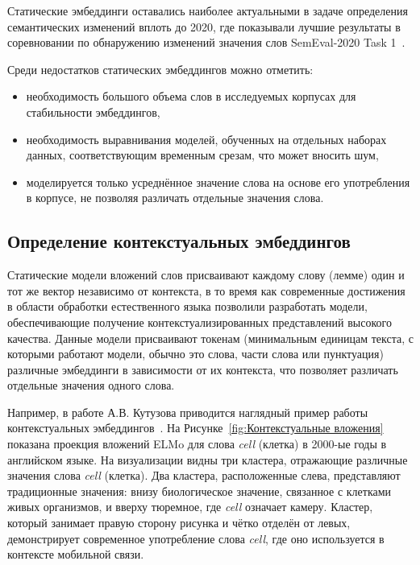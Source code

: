 \documentclass[LI,VKR]{HSEUniversity}
\begin{document}
Статические эмбеддинги оставались наиболее актуальными в задаче определения семантических изменений вплоть до 2020,
где показывали лучшие результаты в соревновании по обнаружению изменений значения слов SemEval-2020 Task 1~\cite{semeval2020task}.

Среди недостатков статических эмбеддингов можно отметить:
\begin{itemize}
    \item необходимость большого объема слов в исследуемых корпусах для стабильности эмбеддингов,
    \item необходимость выравнивания моделей, обученных на отдельных наборах данных,
соответствующим временным срезам, что может вносить шум,
    \item моделируется только усреднённое значение слова на основе его употребления в корпусе,
не позволяя различать отдельные значения слова.
\end{itemize}

\subsection{Определение контекстуальных эмбеддингов}

Статические модели вложений слов присваивают каждому слову (лемме) один и тот же вектор
независимо от контекста, в то время как современные достижения в области обработки
естественного языка позволили разработать модели,
обеспечивающие получение контекстуализированных представлений высокого качества.
Данные модели присваивают токенам (минимальным единицам текста, с которыми работают модели,
обычно это слова, части слова или пунктуация) различные эмбеддинги
в зависимости от их контекста, что позволяет различать отдельные значения одного слова.

Например, в работе А.В. Кутузова приводится наглядный пример работы
контекстуальных эмбеддингов~\cite{Kutuzov2020Thesis}.
На Рисунке~\ref{fig:Контекстуальные вложения} показана проекция вложений ELMo для слова \textit{cell} (клетка)
в 2000-ые годы в английском языке.
На визуализации видны три кластера, отражающие различные значения слова \textit{cell} (клетка).
Два кластера, расположенные слева, представляют традиционные значения:
внизу биологическое значение, связанное с клетками живых организмов,
и вверху тюремное, где \textit{cell} означает камеру.
Кластер, который занимает правую сторону рисунка и чётко отделён от левых,
демонстрирует современное употребление слова \textit{cell},
где оно используется в контексте мобильной связи.
\end{document}
